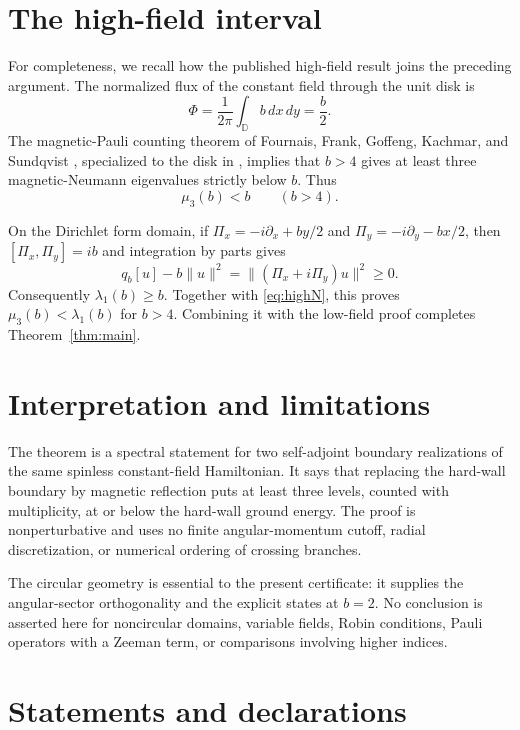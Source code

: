 \documentclass[11pt]{article}
\newcommand{\D}{\mathbb D}
\newcommand{\qb}{q_b}
\begin{document}
\section{The high-field interval}

For completeness, we recall how the published high-field result joins the
preceding argument.  The normalized flux of the constant field through the
unit disk is
\[
  \Phi=\frac{1}{2\pi}\int_{\D}b\,dx\,dy=\frac b2.
\]
The magnetic-Pauli counting theorem of Fournais, Frank, Goffeng, Kachmar,
and Sundqvist \cite[Prop.~2.1]{FournaisEtAl2025}, specialized to the disk in
\cite[Sec.~5]{Lotoreichik2025}, implies that $b>4$ gives at least three
magnetic-Neumann eigenvalues strictly below $b$.  Thus
\begin{equation}\label{eq:highN}
  \mu_3(b)<b\qquad(b>4).
\end{equation}

On the Dirichlet form domain, if
$\Pi_x=-i\partial_x+by/2$ and $\Pi_y=-i\partial_y-bx/2$, then
$[\Pi_x,\Pi_y]=ib$ and integration by parts gives
\[
  \qb[u]-b\|u\|^2
  =\|(\Pi_x+i\Pi_y)u\|^2\geq0.
\]
Consequently $\lambda_1(b)\geq b$.  Together with
\eqref{eq:highN}, this proves
$\mu_3(b)<\lambda_1(b)$ for $b>4$.  Combining it with the low-field proof
completes Theorem~\ref{thm:main}.

\section{Interpretation and limitations}

The theorem is a spectral statement for two self-adjoint boundary
realizations of the same spinless constant-field Hamiltonian.  It says that
replacing the hard-wall boundary by magnetic reflection puts at least three
levels, counted with multiplicity, at or below the hard-wall ground energy.
The proof is nonperturbative and uses no finite angular-momentum cutoff,
radial discretization, or numerical ordering of crossing branches.

The circular geometry is essential to the present certificate: it supplies
the angular-sector orthogonality and the explicit states at $b=2$.  No
conclusion is asserted here for noncircular domains, variable fields, Robin
conditions, Pauli operators with a Zeeman term, or comparisons involving
higher indices.

\section*{Statements and declarations}
\end{document}
